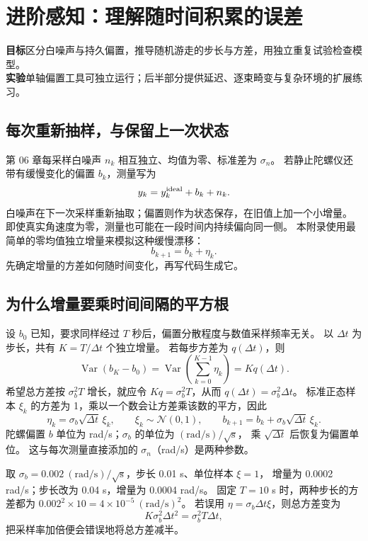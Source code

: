 \chapter{进阶感知：理解随时间积累的误差}
\begin{notebox}
\textbf{目标}\quad 区分白噪声与持久偏置，推导随机游走的步长与方差，用独立重复试验检查模型。\\
\textbf{实验}\quad 单轴偏置工具可独立运行；后半部分提供延迟、逐束畸变与复杂环境的扩展练习。
\end{notebox}
\section{每次重新抽样，与保留上一次状态}
第 06 章每采样白噪声 $n_k$ 相互独立、均值为零、标准差为 $\sigma_n$。
若静止陀螺仪还带有缓慢变化的偏置 $b_k$，测量写为
\[
 y_k=y_k^{\rm ideal}+b_k+n_k.
\]
白噪声在下一次采样重新抽取；偏置则作为状态保存，在旧值上加一个小增量。
即使真实角速度为零，测量也可能在一段时间内持续偏向同一侧。
本附录使用最简单的零均值独立增量来模拟这种缓慢漂移：
\[
 b_{k+1}=b_k+\eta_k.
\]
先确定增量的方差如何随时间变化，再写代码生成它。

\section{为什么增量要乘时间间隔的平方根}
设 $b_0$ 已知，要求同样经过 $T$ 秒后，偏置分散程度与数值采样频率无关。
以 $\Delta t$ 为步长，共有 $K=T/\Delta t$ 个独立增量。
若每步方差为 $q(\Delta t)$，则
\[
 \operatorname{Var}(b_K-b_0)
 =\operatorname{Var}\left(\sum_{k=0}^{K-1}\eta_k\right)=Kq(\Delta t).
\]
希望总方差按 $\sigma_b^2T$ 增长，就应令
$Kq=\sigma_b^2T$，从而 $q(\Delta t)=\sigma_b^2\Delta t$。
标准正态样本 $\xi_k$ 的方差为 1，乘以一个数会让方差乘该数的平方，因此
\begin{equation}
 \eta_k=\sigma_b\sqrt{\Delta t}\,\xi_k,\qquad
 \xi_k\sim\mathcal N(0,1),\qquad
 b_{k+1}=b_k+\sigma_b\sqrt{\Delta t}\,\xi_k.
 \label{eq:bias_step}
\end{equation}
陀螺偏置 $b$ 单位为 rad/s；$\sigma_b$ 的单位为 $(\mathrm{rad/s})/\sqrt{\mathrm s}$，
乘 $\sqrt{\Delta t}$ 后恢复为偏置单位。
这与每次测量直接添加的 $\sigma_n$（rad/s）是两种参数。

取 $\sigma_b=0.002\ (\mathrm{rad/s})/\sqrt{\mathrm s}$，步长 0.01 s、单位样本 $\xi=1$，
增量为 0.0002 rad/s；步长改为 0.04 s，增量为 0.0004 rad/s。
固定 $T=10$ s 时，两种步长的方差都为 $0.002^2\times10=4\times10^{-5}\ (\mathrm{rad/s})^2$。
若误用 $\eta=\sigma_b\Delta t\xi$，则总方差变为
\[
 K\sigma_b^2\Delta t^2=\sigma_b^2T\Delta t,
\]
把采样率加倍便会错误地将总方差减半。

